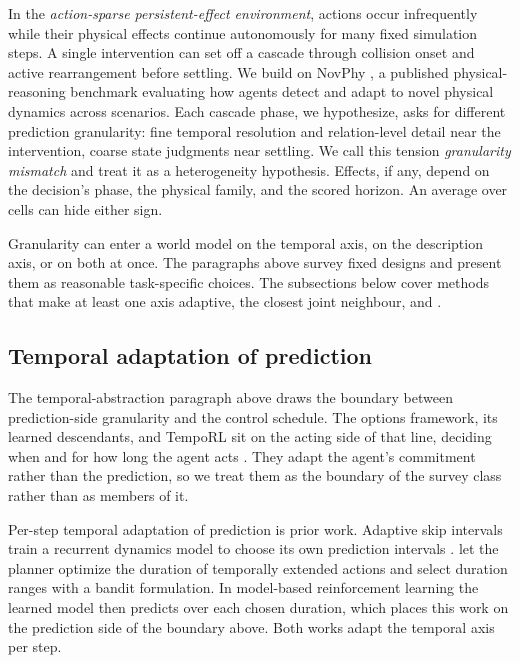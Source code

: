 In the \emph{action-sparse persistent-effect environment}, actions occur infrequently while their physical effects continue autonomously for many fixed simulation steps. A single intervention can set off a cascade through collision onset and active rearrangement before settling. We build on NovPhy \citep{pinto2024novphy}, a published physical-reasoning benchmark \citep{bakhtin2019phyre,bear2021physion,yi2020clevrer} evaluating how agents detect and adapt to novel physical dynamics across scenarios. Each cascade phase, we hypothesize, asks for different prediction granularity: fine temporal resolution and relation-level detail near the intervention, coarse state judgments near settling. We call this tension \emph{granularity mismatch} and treat it as a heterogeneity hypothesis. Effects, if any, depend on the decision's phase, the physical family, and the scored horizon. An average over cells can hide either sign. 

Granularity can enter a world model on the temporal axis, on the description axis, or on both at once. The paragraphs above survey fixed designs and present them as reasonable task-specific choices. The subsections below cover methods that make at least one axis adaptive,  the closest joint neighbour, and . 

\subsection{Temporal adaptation of prediction}
\label{sec:app:rel:temporal}

The temporal-abstraction paragraph above draws the boundary between prediction-side granularity and the control schedule. The options framework, its learned descendants, and TempoRL sit on the acting side of that line, deciding when and for how long the agent acts \citep{sutton1999options,bacon2017optioncritic,biedenkapp2021temporl}. They adapt the agent's commitment rather than the prediction, so we treat them as the boundary of the survey class rather than as members of it.

\begin{revblock}
Per-step temporal adaptation of prediction is prior work. Adaptive skip intervals train a recurrent dynamics model to choose its own prediction intervals \citep{neitz2018adaptive}. \citet{chatterjee2025improving} let the planner optimize the duration of temporally extended actions and select duration ranges with a bandit formulation. In model-based reinforcement learning the learned model then predicts over each chosen duration, which places this work on the prediction side of the boundary above. Both works adapt the temporal axis per step.
\end{revblock}

